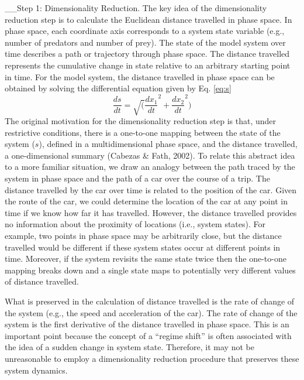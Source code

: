 \documentclass[12pt,twoside,openany]{reedthesis}
\begin{document}
\_\_Step 1: Dimensionality Reduction. The key idea of the dimensionality reduction step is to calculate the Euclidean distance travelled in phase space. In phase space, each coordinate axis corresponds to a system state variable (e.g., number of predators and number of prey). The state of the model system over time describes a path or trajectory through phase space. The distance travelled represents the cumulative change in state relative to an arbitrary starting point in time. For the model system, the distance travelled in phase space can be obtained by solving the differential equation given by Eq. \eqref{eq:s}
\begin{equation}  
\frac{ds}{dt} = \sqrt(\frac{dx_1}{dt}^2 + \frac{dx_2}{dt}^2)
\label{eq:s}
\end{equation}
The original motivation for the dimensionality reduction step is that, under restrictive conditions, there is a one-to-one mapping between the state of the system (\(s\)), defined in a multidimensional phase space, and the distance travelled, a one-dimensional summary (Cabezas \& Fath, 2002). To relate this abstract idea to a more familiar situation, we draw an analogy between the path traced by the system in phase space and the path of a car over the course of a trip. The distance travelled by the car over time is related to the position of the car. Given the route of the car, we could determine the location of the car at any point in time if we know how far it has travelled. However, the distance travelled provides no information about the proximity of locations (i.e., system states). For example, two points in phase space may be arbitrarily close, but the distance travelled would be different if these system states occur at different points in time. Moreover, if the system revisits the same state twice then the one-to-one mapping breaks down and a single state maps to potentially very different values of distance travelled.

What is preserved in the calculation of distance travelled is the rate of change of the system (e.g., the speed and acceleration of the car). The rate of change of the system is the first derivative of the distance travelled in phase space. This is an important point because the concept of a ``regime shift'' is often associated with the idea of a sudden change in system state. Therefore, it may not be unreasonable to employ a dimensionality reduction procedure that preserves these system dynamics.
\end{document}
